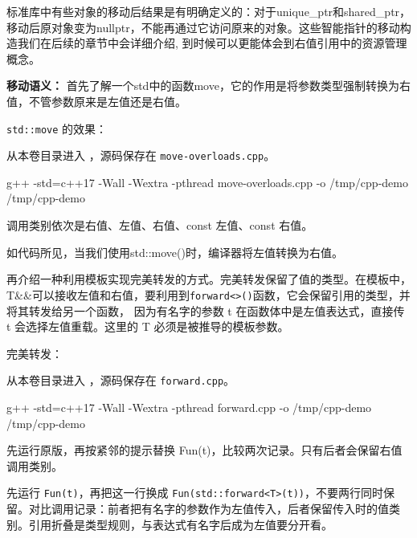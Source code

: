 \begin{note}
标准库中有些对象的移动后结果是有明确定义的：对于unique\_ptr和shared\_ptr，移动后原对象变为nullptr，不能再通过它访问原来的对象。这些智能指针的移动构造我们在后续的章节中会详细介绍, 到时候可以更能体会到右值引用中的资源管理概念。
\end{note}

\textbf{移动语义：}
首先了解一个std中的函数move，它的作用是将参数类型强制转换为右值，不管参数原来是左值还是右值。
\begin{example}
\texttt{std::move} 的效果：



从本卷目录进入 ，源码保存在 \texttt{move-overloads.cpp}。
\begin{tbash}
g++ -std=c++17 -Wall -Wextra -pthread move-overloads.cpp -o /tmp/cpp-demo
/tmp/cpp-demo
\end{tbash}
调用类别依次是右值、左值、右值、const 左值、const 右值。
\end{example}
如代码所见，当我们使用std::move()时，编译器将左值转换为右值。

再介绍一种利用模板实现完美转发的方式。完美转发保留了值的类型。在模板中，T\&\&可以接收左值和右值，要利用到\texttt{forward<>()}函数，它会保留引用的类型，并将其转发给另一个函数，
因为有名字的参数 t 在函数体中是左值表达式，直接传 t 会选择左值重载。这里的 T 必须是被推导的模板参数。

\begin{example}
完美转发：



从本卷目录进入 ，源码保存在 \texttt{forward.cpp}。
\begin{tbash}
g++ -std=c++17 -Wall -Wextra -pthread forward.cpp -o /tmp/cpp-demo
/tmp/cpp-demo
\end{tbash}
先运行原版，再按紧邻的提示替换 Fun(t)，比较两次记录。只有后者会保留右值调用类别。
\end{example}

\begin{note}
先运行 \texttt{Fun(t)}，再把这一行换成 \texttt{Fun(std::forward<T>(t))}，不要两行同时保留。对比调用记录：前者把有名字的参数作为左值传入，后者保留传入时的值类别。引用折叠是类型规则，与表达式有名字后成为左值要分开看。
\end{note}

